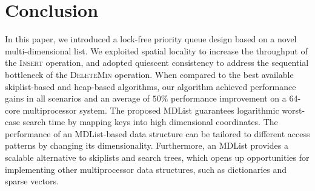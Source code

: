 \documentclass[10pt,journal,letterpaper,compsoc]{IEEEtran}
\begin{document}
\section{Conclusion}
\label{sec:conclusion}
In this paper, we introduced a lock-free priority queue design based on a novel multi-dimensional list.
We exploited spatial locality to increase the throughput of the \textsc{Insert} operation, and adopted quiescent consistency to address the sequential bottleneck of the \textsc{DeleteMin} operation.
When compared to the best available skiplist-based and heap-based algorithms, our algorithm achieved performance gains in all scenarios and an average of $50\%$ performance improvement on a 64-core multiprocessor system.
The proposed MDList guarantees logarithmic worst-case search time by mapping keys into high dimensional coordinates.
The performance of an MDList-based data structure can be tailored to different access patterns by changing its dimensionality.
Furthermore, an MDList provides a scalable alternative to skiplists and search trees, which opens up opportunities for implementing other multiprocessor data structures, such as dictionaries and sparse vectors. 



\end{document}
